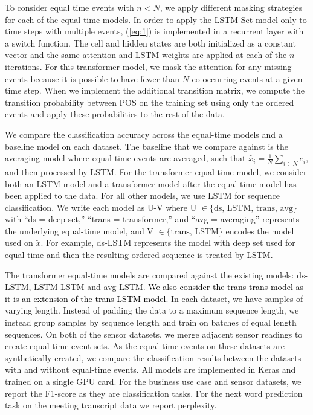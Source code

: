 \documentclass[reqno ,11pt]{article}
\begin{document}
To consider equal time events with $n < N$, we apply different masking strategies for each of the equal time models. In order to apply the LSTM Set model only to time steps with multiple events, (\ref{eq:1}) is implemented in a recurrent layer with a switch function. The cell and hidden states are both initialized as a constant vector and the same attention and LSTM weights are applied at each of the $n$ iterations. For this transformer model, we mask the attention for any missing events because it is possible to have fewer than $N$ co-occurring events at a given time step. When we implement the additional transition matrix, we compute the transition probability between POS on the training set using only the ordered events and apply these probabilities to the rest of the data. 

We compare the classification accuracy across the equal-time models and a baseline model on each dataset. The baseline that we compare against is the averaging model where equal-time events are averaged, such that $\tilde{x_i} = \frac1N\sum_{i\in N} e_i$, and then processed by LSTM. For the transformer equal-time model, we consider both an LSTM model and a transformer model after the equal-time model has been applied to the data. For all other models, we use LSTM for sequence classification. We write each model as U-V where U $\in \{ \text{ds, LSTM, trans, avg}\}$ with ``ds = deep set,'' ``trans = transformer,'' and ``avg = averaging'' represents the underlying equal-time model, and V $\in \{ \text{trans, LSTM}\}$ encodes the model used on $\tilde{x}$. For example, ds-LSTM represents the model with deep set used for equal time and then the resulting ordered sequence is treated by LSTM. 

The transformer equal-time models are compared against the existing models: ds-LSTM, LSTM-LSTM and avg-LSTM. \textcolor{black}{We also consider the trans-trans model as it is an extension of the trans-LSTM model.} In each dataset, we have samples of varying length. Instead of padding the data to a maximum sequence length, we instead group samples by sequence length and train on batches of equal length sequences. On both of the sensor datasets, we merge adjacent sensor readings to create equal-time event sets. As the equal-time events on these datasets are synthetically created, we compare the classification results between the datasets with and without equal-time events. All models are implemented in Keras and trained on a single GPU card. For the business use case and sensor datasets, we report the F1-score as they are classification tasks. For the next word prediction task on the meeting transcript data we report perplexity. 
\end{document}
